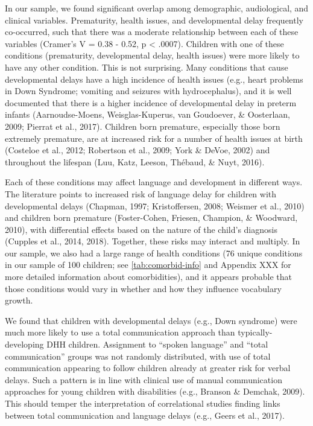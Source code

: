 \documentclass[
  english,
  man]{apa6}
\begin{document}
In our sample, we found significant overlap among demographic, audiological, and clinical variables. Prematurity, health issues, and developmental delay frequently co-occurred, such that there was a moderate relationship between each of these variables (Cramer's V = 0.38 - 0.52, p \textless{} .0007). Children with one of these conditions (prematurity, developmental delay, health issues) were more likely to have any other condition. This is not surprising. Many conditions that cause developmental delays have a high incidence of health issues (e.g., heart problems in Down Syndrome; vomiting and seizures with hydrocephalus), and it is well documented that there is a higher incidence of developmental delay in preterm infants (Aarnoudse-Moens, Weisglas-Kuperus, van Goudoever, \& Oosterlaan, 2009; Pierrat et al., 2017). Children born premature, especially those born extremely premature, are at increased risk for a number of health issues at birth (Costeloe et al., 2012; Robertson et al., 2009; York \& DeVoe, 2002) and throughout the lifespan (Luu, Katz, Leeson, Thébaud, \& Nuyt, 2016).

Each of these conditions may affect language and development in different ways. The literature points to increased risk of language delay for children with developmental delays (Chapman, 1997; Kristoffersen, 2008; Weismer et al., 2010) and children born premature (Foster-Cohen, Friesen, Champion, \& Woodward, 2010), with differential effects based on the nature of the child's diagnosis (Cupples et al., 2014, 2018). Together, these risks may interact and multiply. In our sample, we also had a large range of health conditions (76 unique conditions in our sample of 100 children; see \ref{tab:comorbid-info} and Appendix XXX for more detailed information about comorbidities), and it appears probable that those conditions would vary in whether and how they influence vocabulary growth.

We found that children with developmental delays (e.g., Down syndrome) were much more likely to use a total communication approach than typically-developing DHH children. Assignment to \enquote{spoken language} and \enquote{total communication} groups was not randomly distributed, with use of total communication appearing to follow children already at greater risk for verbal delays. Such a pattern is in line with clinical use of manual communication approaches for young children with disabilities (e.g., Branson \& Demchak, 2009). This should temper the interpretation of correlational studies finding links between total communication and language delays (e.g., Geers et al., 2017).
\end{document}
